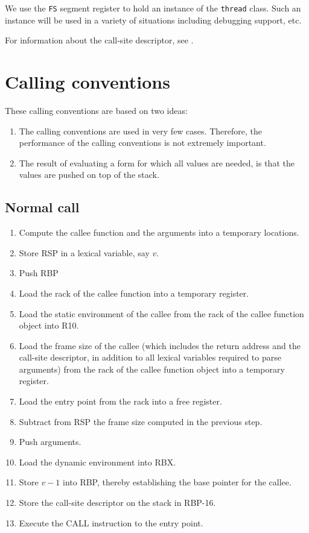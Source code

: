 We use the \texttt{FS} segment register to hold an instance of the
\texttt{thread} class.  Such an instance will be used in a variety of
situations including debugging support, etc.

For information about the call-site descriptor, see
.

\section{Calling conventions}

These calling conventions are based on two ideas:

\begin{enumerate}
\item The calling conventions are used in very few cases.  Therefore,
  the performance of the calling conventions is not extremely
  important.
\item The result of evaluating a form for which all values are needed,
  is that the values are pushed on top of the stack.
\end{enumerate}

\subsection{Normal call}

\begin{enumerate}
\item Compute the callee function and the arguments into a temporary
  locations.
\item Store RSP in a lexical variable, say $v$.
\item Push RBP
\item Load the rack of the callee function into a temporary register.
\item Load the static environment of the callee from the rack of the
  callee function object into R10.
\item Load the frame size of the callee (which
  includes the return address and the call-site descriptor, in
  addition to all lexical variables required to parse arguments) from
  the rack of the callee function object into a temporary register.
\item Load the entry point from the rack into a free register.
\item Subtract from RSP the frame size computed in the
  previous step.
\item Push arguments.
\item Load the dynamic environment into RBX.
\item Store $v-1$ into RBP, thereby establishing the base pointer
  for the callee.
\item Store the call-site descriptor on the stack in RBP-16.
\item Execute the CALL instruction to the entry point.
\end{enumerate}

